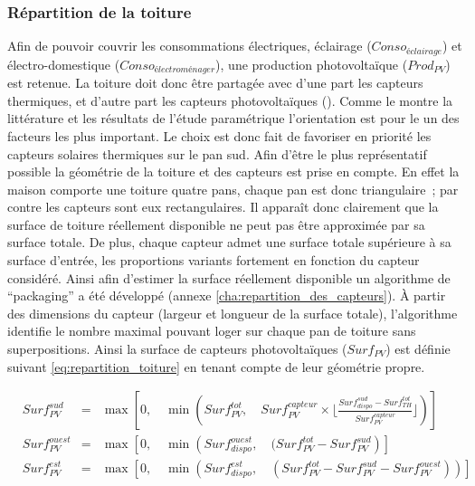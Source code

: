 \subsubsection{Répartition de la toiture} %
\label{ssub:repartition_de_la_toiture}
Afin de pouvoir couvrir les consommations électriques, éclairage ($Conso_{éclairage}$) et
électro-domestique ($Conso_{électroménager}$), une production photovoltaïque ($Prod_{PV}$)
est retenue. La toiture doit donc être partagée avec d’une part les capteurs thermiques, et
d’autre part les capteurs photovoltaïques (). Comme le montre la littérature et les résultats
de l’étude paramétrique l’orientation est pour le  un des facteurs les plus
important. Le choix est donc fait de favoriser en priorité les capteurs solaires
thermiques sur le pan sud. Afin d’être le plus représentatif possible la géométrie
de la toiture et des capteurs est prise en compte.
En effet la maison comporte une toiture quatre pans, chaque pan est donc triangulaire~; par
contre les capteurs sont eux rectangulaires. Il apparaît donc clairement que la surface
de toiture réellement disponible ne peut pas être approximée par sa surface totale.
De plus, chaque capteur admet une surface totale supérieure à sa surface d’entrée,
les proportions variants fortement en fonction du capteur considéré.
Ainsi afin d’estimer la surface réellement disponible un algorithme de \enquote{packaging}
a été développé (annexe \ref{cha:repartition_des_capteurs}). À partir des dimensions
du capteur (largeur et longueur de la surface totale), l’algorithme identifie le
nombre maximal pouvant loger sur chaque pan de toiture sans superpositions.
Ainsi la surface de capteurs photovoltaïques ($Surf_{PV}$) est définie suivant
\eqref{eq:repartition_toiture} en tenant compte de leur géométrie propre.

\begin{equation}\label{eq:repartition_toiture}
  \begin{aligned}
    &Surf_{PV}^{sud}   &=& \max\left[0,\quad \min \left(Surf_{PV}^{tot},\quad Surf_{PV}^{capteur} \times
                                                      \Bigg\lfloor\frac{Surf_{dispo}^{sud} - Surf_{TH}^{tot}}{Surf_{PV}^{capteur}}\Bigg\rfloor\right)
                                   \right] \\
    &Surf_{PV}^{ouest} &=& \max \left[0,\quad \min\left(Surf_{dispo}^{ouest},\quad
                                                      (Surf_{PV}^{tot} - Surf_{PV}^{sud}\right)
                                    \right] \\
    &Surf_{PV}^{est} &=& \max \left[0,\quad \min\left(Surf_{dispo}^{est},\quad
                                                    (Surf_{PV}^{tot} - Surf_{PV}^{sud} - Surf_{PV}^{ouest}) \right) \right] \\
  \end{aligned}
\end{equation}

